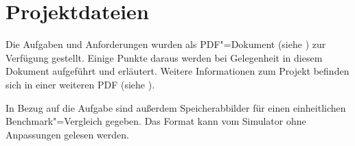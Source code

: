 

\section{Projektdateien}
\label{section:Pflichtenheft-Istzustand-Projektdateien}

Die Aufgaben und Anforderungen wurden als PDF"=Dokument (siehe \cite{aufgabenblatt}) zur Verfügung gestellt. Einige Punkte daraus werden bei Gelegenheit in diesem Dokument aufgeführt und erläutert. Weitere Informationen zum Projekt befinden sich in einer weiteren PDF (siehe \cite{projektinfo}).

In Bezug auf die Aufgabe sind außerdem Speicherabbilder für einen einheitlichen Benchmark"=Vergleich gegeben. Das Format kann vom Simulator ohne Anpassungen gelesen werden.

